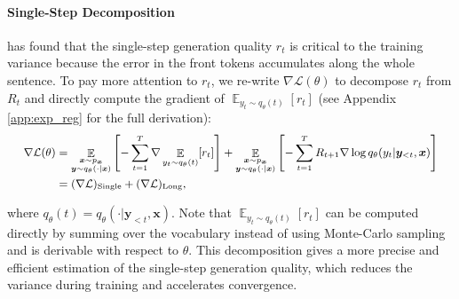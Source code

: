 \documentclass{article}
\def\expct{\mathop{\mathbb{E}}}
\def\pst{q_{\theta}(y_t | \by_{<t}, \bx)}
\def\pstp{q_{\theta}(y_{t'} | \by_{<t'}, \bx)}
\def\pttp{p(y_{t'} | \by_{<t'}, \bx)}
\def\bx{\bm{x}}
\def\by{\bm{y}}
\begin{document}
\paragraph{Single-Step Decomposition}
\cite{kd_policy_kd} has found that the single-step generation quality $r_t$ is critical to the training variance because the error in the front tokens accumulates along the whole sentence. To pay more attention to $r_t$, we re-write $\nabla \mathcal{L}(\theta)$ to decompose $r_t$ from $R_t$ and directly compute the gradient of $\expct_{y_t \sim q_\theta (t)}[r_t]$ (see Appendix \ref{app:exp_reg} for the full derivation):
\begin{equation}
\small
\begin{aligned}
    \label{eq:exp_reg}
    \nabla \mathcal{L}(\theta) &= \expct_{\substack{\bx \sim p_{\bx} \\ \by \sim q_{\theta}(\cdot | \bx)}} \left[ - \sum_{t=1}^T\nabla \expct_{y_t \sim q_\theta (t)}[r_t]\right] + \expct_{\substack{\bx \sim p_{\bx} \\ \by \sim q_{\theta}(\cdot | \bx)}} \left[ -\sum_{t=1}^T R_{t+1} \nabla \log \pst \right]\\
    &= (\nabla \mathcal{L})_{\text{Single}} + (\nabla \mathcal{L})_{\text{Long}},
\end{aligned}    
\end{equation}

where $q_\theta(t)=q_\theta(\cdot | \by_{<t}, \bx)$. 
Note that $\expct_{y_t \sim q_\theta(t)}[r_t]$ can be computed directly by summing over the vocabulary instead of using Monte-Carlo sampling and is derivable with respect to $\theta$. This decomposition gives a more precise and efficient estimation of the single-step generation quality, which reduces the variance during training and accelerates convergence.

\vspace{-2pt}
\end{document}
